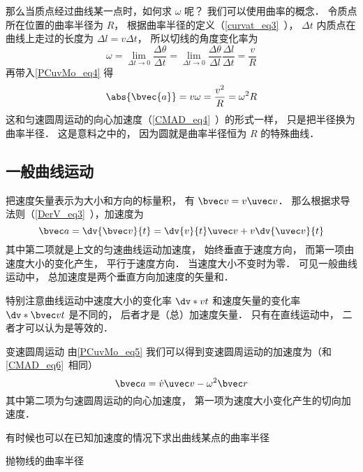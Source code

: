 那么当质点经过曲线某一点时，如何求 $\omega$ 呢？ 我们可以使用曲率的概念． 令质点所在位置的曲率半径为 $R$， 根据曲率半径的定义（\autoref{curvat_eq3}~）， $\Delta t$ 内质点在曲线上走过的长度为 $\Delta l = v \Delta t$， 所以切线的角度变化率为
\begin{equation}
\omega = \lim_{\Delta t\to 0}\frac{\Delta \theta}{\Delta t} = \lim_{\Delta t\to 0}\frac{\Delta \theta}{\Delta l} \frac{\Delta l}{\Delta t} = \frac{v}{R}
\end{equation}
再带入\autoref{PCuvMo_eq4} 得
\begin{equation}\label{PCuvMo_eq3}
\abs{\bvec{a}} = v\omega = \frac{v^2}{R} = \omega^2 R
\end{equation}
这和匀速圆周运动的向心加速度（\autoref{CMAD_eq4}~）的形式一样， 只是把半径换为曲率半径． 这是意料之中的， 因为圆就是曲率半径恒为 $R$ 的特殊曲线．

\subsection{一般曲线运动}
把速度矢量表示为大小和方向的标量积， 有 $\bvec v = v\uvec v$． 那么根据求导法则（\autoref{DerV_eq3}~），加速度为
\begin{equation}\label{PCuvMo_eq5}
\bvec a = \dv{\bvec v}{t} = \dv{v}{t}\uvec v + v\dv{\uvec v}{t}
\end{equation}
其中第二项就是上文的匀速曲线运动加速度， 始终垂直于速度方向， 而第一项由速度大小的变化产生， 平行于速度方向． 当速度大小不变时为零． 可见一般曲线运动中， 总加速度是两个垂直方向加速度的矢量和．

特别注意曲线运动中速度大小的变化率 $\dv*{v}{t}$ 和速度矢量的变化率 $\dv*{\bvec v}{t}$ 是不同的， 后者才是（总）加速度矢量． 只有在直线运动中， 二者才可以认为是等效的．

\begin{example}{变速圆周运动}\label{PCuvMo_ex1}
由\autoref{PCuvMo_eq5} 我们可以得到变速圆周运动的加速度为（和\autoref{CMAD_eq6}~相同）
\begin{equation}
\bvec a = \dot v \uvec v - \omega ^2 \bvec r
\end{equation}
其中第二项为匀速圆周运动的向心加速度， 第一项为速度大小变化产生的切向加速度．
\end{example}

有时候也可以在已知加速度的情况下求出曲线某点的曲率半径
\begin{example}{抛物线的曲率半径}

\end{example}
